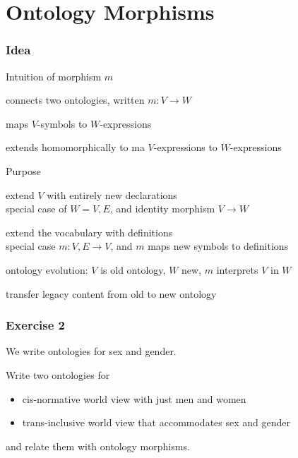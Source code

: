 \section{Ontology Morphisms}

\begin{frame}\frametitle{Idea}
\begin{blockitems}{Intuition of morphism $m$}
\item connects two ontologies, written $m:V\to W$
\item maps $V$-symbols to $W$-expressions
\item extends homomorphically to ma $V$-expressions to $W$-expressions
\end{blockitems}

\begin{blockitems}{Purpose}
\item extend $V$ with entirely new declarations \\
  special case of $W=V,E$, and identity morphism $V\to W$
\item extend the vocabulary with definitions \\
   special case $m:V,E\to V$, and $m$ maps new symbols to definitions
\item ontology evolution: $V$ is old ontology, $W$ new, $m$ interprets $V$ in $W$
\item transfer legacy content from old to new ontology
\end{blockitems}
\end{frame}

\begin{frame}[fragile]\frametitle{Exercise 2}
We write ontologies for sex and gender.

Write two ontologies for
\begin{itemize}
\item cis-normative world view with just men and women
\item trans-inclusive world view that accommodates sex and gender
\end{itemize}
and relate them with ontology morphisms.
\end{frame}

